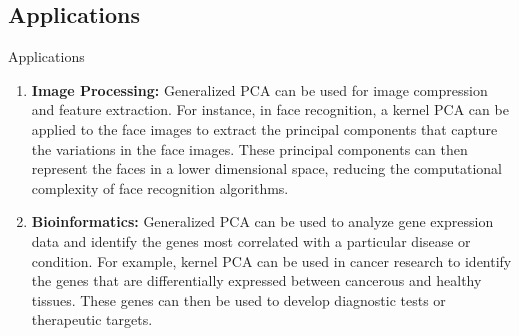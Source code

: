 \documentclass{beamer}
\begin{document}
\subsection{Applications}
\begin{frame}{Applications}
    \begin{enumerate}
        \item \textbf{Image Processing:} Generalized PCA can be used for image compression and feature extraction. For instance, in face recognition, a kernel PCA can be applied to the face images to extract the principal components that capture the variations in the face images. These principal components can then represent the faces in a lower dimensional space, reducing the computational complexity of face recognition algorithms.
       \item \textbf{Bioinformatics:} Generalized PCA can be used to analyze gene expression data and identify the genes most correlated with a particular disease or condition. For example, kernel PCA can be used in cancer research to identify the genes that are differentially expressed between cancerous and healthy tissues. These genes can then be used to develop diagnostic tests or therapeutic targets.
    \end{enumerate}
\end{frame}
\end{document}

